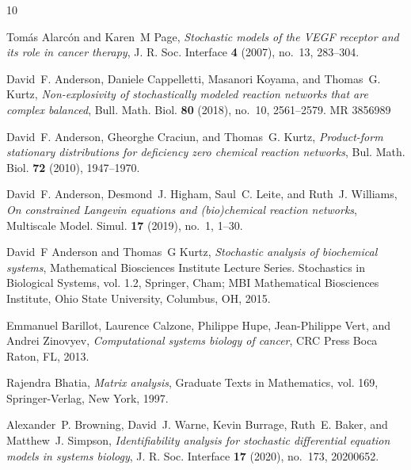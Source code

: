 \documentclass[10pt,a4paper]{amsart}
\theoremstyle{definition}
\theoremstyle{remark}
\theoremstyle{consequence}
\numberwithin{equation}{section}
\begin{document}
\providecommand{\bysame}{\leavevmode\hbox to3em{\hrulefill}\thinspace}
\providecommand{\MR}{\relax\ifhmode\unskip\space\fi MR }
\providecommand{\MRhref}[2]{%
  \href{http://www.ams.org/mathscinet-getitem?mr=#1}{#2}
}
\providecommand{\href}[2]{#2}
\begin{thebibliography}{10}

Tom{\'a}s Alarc{\'o}n and Karen~M Page, \emph{Stochastic models of the {VEGF}
  receptor and its role in cancer therapy}, J. R. Soc. Interface \textbf{4}
  (2007), no.~13, 283--304.

David~F. Anderson, Daniele Cappelletti, Masanori Koyama, and Thomas~G. Kurtz,
  \emph{Non-explosivity of stochastically modeled reaction networks that are
  complex balanced}, Bull. Math. Biol. \textbf{80} (2018), no.~10, 2561--2579.
  \MR{3856989}

David~F. Anderson, Gheorghe Craciun, and Thomas~G. Kurtz, \emph{{Product-form
  stationary distributions for deficiency zero chemical reaction networks}},
  Bul. Math. Biol. \textbf{72} (2010), 1947--1970.

David~F. Anderson, Desmond~J. Higham, Saul~C. Leite, and Ruth~J. Williams,
  \emph{On constrained {L}angevin equations and (bio)chemical reaction
  networks}, Multiscale Model. Simul. \textbf{17} (2019), no.~1, 1--30.

David~F Anderson and Thomas~G Kurtz, \emph{Stochastic analysis of biochemical
  systems}, Mathematical Biosciences Institute Lecture Series. Stochastics in
  Biological Systems, vol. 1.2, Springer, Cham; MBI Mathematical Biosciences
  Institute, Ohio State University, Columbus, OH, 2015.

Emmanuel Barillot, Laurence Calzone, Philippe Hupe, Jean-Philippe Vert, and
  Andrei Zinovyev, \emph{Computational systems biology of cancer}, CRC Press
  Boca Raton, FL, 2013.

Rajendra Bhatia, \emph{Matrix analysis}, Graduate Texts in Mathematics, vol.
  169, Springer-Verlag, New York, 1997.

Alexander~P. Browning, David~J. Warne, Kevin Burrage, Ruth~E. Baker, and
  Matthew~J. Simpson, \emph{Identifiability analysis for stochastic
  differential equation models in systems biology}, J. R. Soc. Interface
  \textbf{17} (2020), no.~173, 20200652.


\end{thebibliography}
\end{document}

